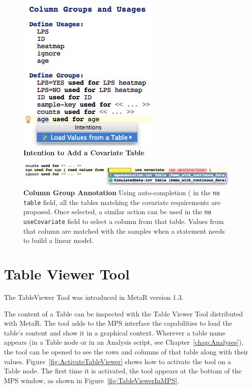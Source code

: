\begin{figure}
\centering
  \includegraphics[width=\figWidthTiny]{figures/IntentionForAddingCovariateTable.png}
\caption[Intention to add a Covariate Table]{\textbf{Intention to Add a Covariate Table} }
\label{fig:AddCovariateTable}
\end{figure}

\begin{figure}
\centering
  \includegraphics[width=\figWidthWide]{figures/GroupAnnotation.png}
\caption[Column Group Annotation]{\textbf{Column Group Annotation} Using auto-completion (\keys{\ctrl+\space} in the \texttt{no table} field, all the tables matching the covariate requirements are proposed. Once selected, a similar action can be used in the  \texttt{no useCovariate} field to select a column from that table. Values from that column are matched with the samples when a statement needs to build a linear model.}
\label{fig:GroupAnnotation}
\end{figure}

\section{Table Viewer Tool}\label{sec:TableViewerTool}
\begin{remark}
The TableViewer Tool was introduced in MetaR version 1.3.
\end{remark}

The content of a Table can be inspected with the Table Viewer Tool distributed with MetaR. The tool adds to the MPS interface the capabilities to load the table's content and show it in a graphical context.
Wherever a table name appears (in a Table node or in an Analysis script, see Chapter~\ref{chap:Analyses}), the tool can be opened to see the rows and columns of that table along with their values. Figure~\ref{fig:ActivateTableViewer} shows how to activate the tool on a Table node. The first time it is activated, the tool appears at the bottom of the MPS window, as shown in Figure~\ref{fig:TableViewerInMPS}.


